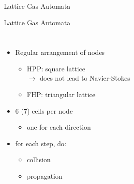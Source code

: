 \documentclass[aspectratio=43,t]{beamer}
\newlength\figureheight 				%
\newlength\figurewidth
\newlength\cacellsize
\begin{document}
\begin{section}{Lattice Gas Automata}
	\begin{frame}{Lattice Gas Automata}
		\begin{columns}
			\begin{itemize}
				\item Regular arrangement of nodes
				\begin{itemize}
					\item<2-> HPP: square lattice \\$\rightarrow$ does not lead to Navier-Stokes
					\item<3-> FHP: triangular lattice%
				\end{itemize}
				\item<4-> 6 (7) cells per node
				\begin{itemize}
					\item<4-> one for each direction
				\end{itemize}
				\item<5-> for each step, do:
				\begin{itemize}
					\item<6-> collision
					\item<8-> propagation
				\end{itemize}
			\end{itemize}
			\setlength\cacellsize{2cm}
		\end{columns}
	\end{frame}


\end{section}
\end{document}
